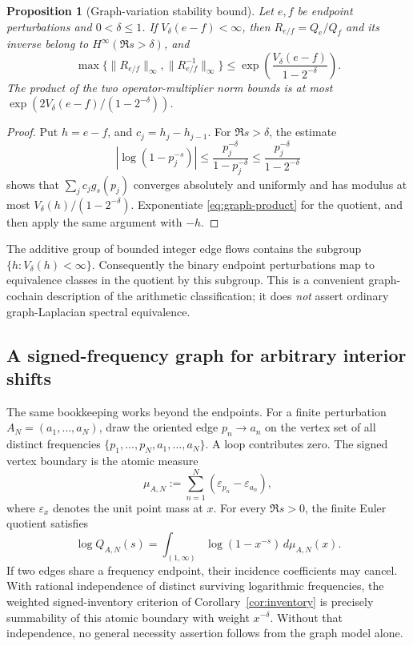 \documentclass[12pt,letterpaper]{article}
\newtheorem{proposition}[theorem]{Proposition}
\numberwithin{equation}{section}
\theoremstyle{remark}
\begin{document}
\begin{proposition}[Graph-variation stability bound]
\label{prop:graph-conditioning}
Let \(e,f\) be endpoint perturbations and \(0<\delta\le1\).
If \(V_\delta(e-f)<\infty\), then
\(R_{e/f}=Q_e/Q_f\) and its inverse belong to
\(H^\infty(\Re s>\delta)\), and
\begin{equation}\label{eq:graph-stability}
 \max\{\|R_{e/f}\|_\infty,\|R_{e/f}^{-1}\|_\infty\}
 \le \exp\!\left(\frac{V_\delta(e-f)}{1-2^{-\delta}}\right).
\end{equation}
The product of the two operator-multiplier norm bounds is at most
\(\exp(2V_\delta(e-f)/(1-2^{-\delta}))\).
\end{proposition}
\begin{proof}
Put \(h=e-f\), and \(c_j=h_j-h_{j-1}\).
For \(\Re s>\delta\), the estimate
\[
 |\log(1-p_j^{-s})|
 \le \frac{p_j^{-\delta}}{1-p_j^{-\delta}}
 \le \frac{p_j^{-\delta}}{1-2^{-\delta}}
\]
shows that \(\sum_j c_jg_s(p_j)\) converges absolutely and uniformly
and has modulus at most
\(V_\delta(h)/(1-2^{-\delta})\).
Exponentiate \eqref{eq:graph-product} for the quotient, and then
apply the same argument with \(-h\).
\end{proof}

The additive group of bounded integer edge flows contains the subgroup
\(\{h:V_\delta(h)<\infty\}\).
Consequently the binary endpoint perturbations map to equivalence
classes in the quotient by this subgroup.  This is a convenient
graph-cochain description of the arithmetic classification; it does
\emph{not} assert ordinary graph-Laplacian spectral equivalence.

\subsection{A signed-frequency graph for arbitrary interior shifts}

The same bookkeeping works beyond the endpoints.  For a finite
perturbation \(A_N=(a_1,\ldots,a_N)\), draw the oriented edge
\(p_n\to a_n\) on the vertex set of all distinct frequencies
\(\{p_1,\ldots,p_N,a_1,\ldots,a_N\}\).  A loop contributes zero.
The signed vertex boundary is the atomic measure
\[
 \mu_{A,N}:=\sum_{n=1}^N(\varepsilon_{p_n}-\varepsilon_{a_n}),
\]
where \(\varepsilon_x\) denotes the unit point mass at \(x\).
For every \(\Re s>0\), the finite Euler quotient satisfies
\begin{equation}\label{eq:graph-atomic}
 \log Q_{A,N}(s)=
 \int_{(1,\infty)}\log(1-x^{-s})\,d\mu_{A,N}(x).
\end{equation}
If two edges share a frequency endpoint, their incidence
coefficients may cancel.  With rational independence of distinct
surviving logarithmic frequencies, the weighted signed-inventory
criterion of Corollary~\ref{cor:inventory} is precisely
summability of this atomic boundary with weight \(x^{-\delta}\).
Without that independence, no general necessity assertion follows
from the graph model alone.
\end{document}

